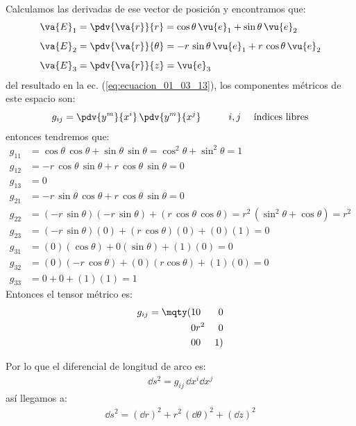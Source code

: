 Calculamos las derivadas de ese vector de posición y encontramos que:
\begin{align*}
\va{E}_{1} &= \pdv{\va{r}}{r} = \cos \theta \, \vu{e}_{1} + \sin \theta \, \vu{e}_{2} \\[0.5em]
\va{E}_{2} &= \pdv{\va{r}}{\theta} = -r \, \sin \theta \, \vu{e}_{1} + r \, \cos \theta \, \vu{e}_{2} \\[0.5em]
\va{E}_{3} &= \pdv{\va{r}}{z} = \vu{e}_{3}
\end{align*}
del resultado en la ec. (\ref{eq:ecuacion_01_03_13}), los componentes métricos de este espacio son:
\begin{align*}
g_{ij} = \pdv{y^{m}}{x^{i}} \, \pdv{y^{m}}{x^{j}} \hspace{1cm} i, j \quad \mbox{ índices libres}
\end{align*}
entonces tendremos que:
\begin{align*}
g_{11} &= \cos \theta \, \cos \theta + \sin \theta \, \sin \theta = \cos^{2} \theta + \sin^{2} \theta = 1 \\[0.5em]
g_{12} &= - r \, \cos \theta \, \sin \theta + r \, \cos \theta \, \sin \theta = 0 \\[0.5em]
g_{13} &= 0 \\[0.5em]
g_{21} &= - r \, \sin \theta \, \cos \theta + r \, \cos \theta \, \sin \theta = 0 \\[0.5em] 
g_{22} &= (-r \, \sin \theta)(- r \, \sin \theta) + (r \, \cos \theta \, \cos \theta) = r^{2} \, (\sin^{2} \theta + \cos \theta) = r^{2} \\[0.5em]
g_{23} &= (- r \, \sin \theta)(0) + (r \, \cos \theta)(0) + (0)(1) = 0 \\[0.5em]
g_{31} &= (0)(\cos \theta) + 0 (\sin \theta) + (1)(0) = 0 \\[0.5em]
g_{32} &= (0)(- r \, \cos \theta) + (0)(r \cos \theta) + (1)(0) = 0 \\[0.5em]
g_{33} &= 0 + 0 + (1)(1) = 1
\end{align*}
Entonces el tensor métrico es:
\begin{align*}
g_{ij} = \mqty(
1 & 0 & 0 \\
0 & r^{2} & 0 \\
0 & 0 & 1 )
\end{align*}

Por lo que el diferencial de longitud de arco es:
\begin{align*}
\dd{s}^{2} = g_{ij} \, \dd{x}^{i} \dd{x}^{j}
\end{align*}
así llegamos a:
\begin{align*}
\dd{s}^{2} = (\dd{r})^{2} + r^{2} \, (\dd{\theta})^{2} + (\dd{z})^{2}
\end{align*}

